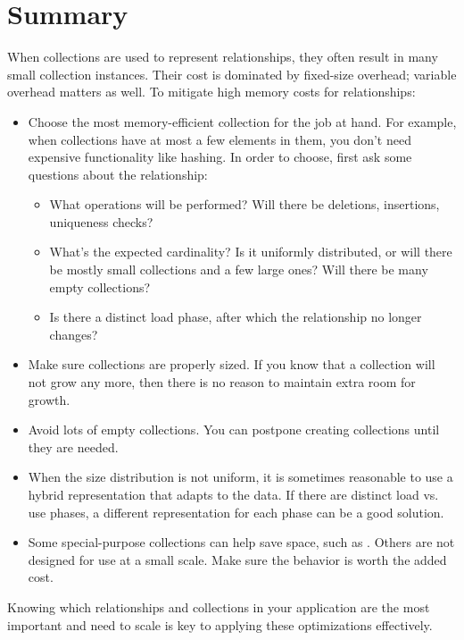 \FloatBarrier

\section{Summary}

When collections are used to represent relationships, they often result in many
small collection instances. Their cost is dominated by fixed-size
overhead; variable overhead matters as well. To mitigate high memory costs
for relationships:
\begin{itemize}
  \item Choose the most memory-efficient collection for the job at hand. For
  example, when collections have at most a few elements in them, you
  don't need expensive functionality like hashing. In
  order to choose, first ask some questions about the relationship:
  \begin{itemize}
    \item What operations will be performed? Will there be deletions,
    insertions, uniqueness checks?
    \item What's the expected cardinality? Is it uniformly
    distributed, or will there be mostly small
    collections and a few large ones? Will there be many empty collections?
    \item Is there a distinct load phase, after which the relationship no
    longer changes?
  \end{itemize}
  \item Make sure collections are properly sized. If you know that a collection
  will not grow any more, then there is no reason to maintain extra room for
  growth.
  \item Avoid lots of empty collections. You can postpone creating collections
  until they are needed.
 \item When the size distribution is not uniform, it is sometimes reasonable to
 use a hybrid representation that adapts to the data. If there are
 distinct load vs. use phases, a different representation
 for each phase can be a good solution.
 \item Some special-purpose collections can help save space, such as
 . Others are not
 designed for use at a small scale. Make sure the
 behavior is worth the added cost.
\end{itemize}
Knowing which relationships and collections in your application are the most
important and need to scale is key to applying these optimizations effectively.  




